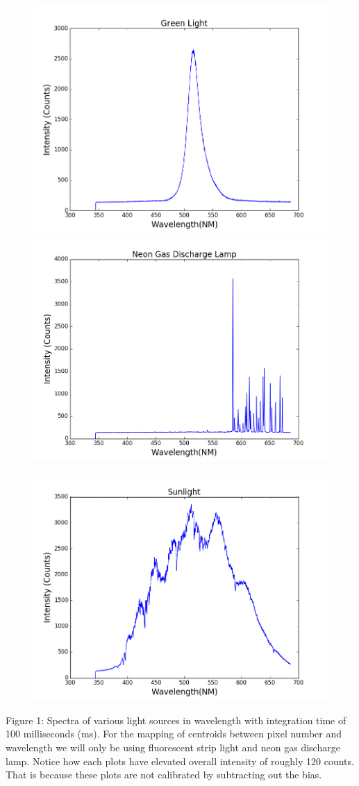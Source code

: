 \documentclass[onecolumn, 12pt, a4paper]{article}
\begin{document}
  \begin{subfigure}{\linewidth}
  \includegraphics[width=.5\linewidth]{Greenlight.png}
  \includegraphics[width=.5\linewidth]{neon.png}
  \centerline{\includegraphics[scale=.4]{sunlight.png}}
  \end{subfigure}\par\medskip
  \linebreak
  Figure 1: Spectra of various light sources in wavelength with integration time of 100 milliseconds (ms). For the mapping of centroids between pixel number and wavelength we will only be using fluorescent strip light and neon gas discharge lamp. Notice how each plots have elevated overall intensity of roughly 120 counts. That is because these plots are not calibrated by subtracting out the bias.
\end{document}
